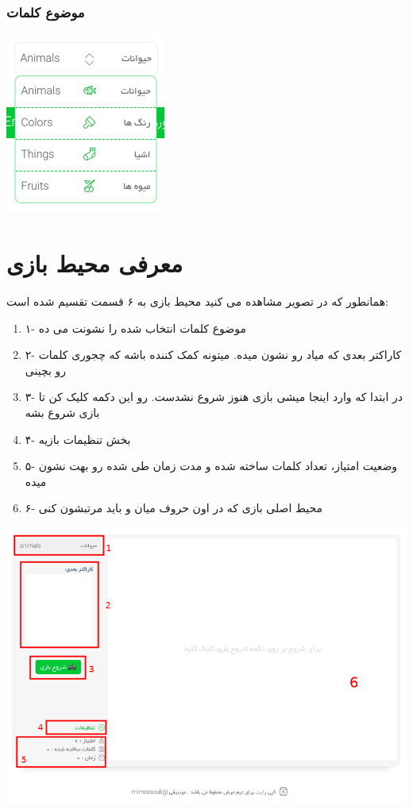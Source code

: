 \documentclass[]{article}
\providecommand{\tightlist}{%
  \setlength{\itemsep}{0pt}\setlength{\parskip}{0pt}}
\begin{document}
\subsubsection{موضوع
کلمات}\label{ux645ux648ux636ux648ux639-ux6a9ux644ux645ux627ux62a}

\includegraphics{../images/select-category.png}

\section{معرفی محیط
بازی}\label{ux645ux639ux631ux641ux6cc-ux645ux62dux6ccux637-ux628ux627ux632ux6cc}

همانطور که در تصویر مشاهده می کنید محیط بازی به ۶ قسمت تقسیم شده است:

\begin{enumerate}
\tightlist
\item
  ۱- موضوع کلمات انتخاب شده را نشونت می ده
\item
  ۲- کاراکتر بعدی که میاد رو نشون میده. میتونه کمک کننده باشه که چجوری
  کلمات رو بچینی
\item
  ۳- در ابتدا که وارد اینجا میشی بازی هنوز شروع نشدست. رو این دکمه کلیک
  کن تا بازی شروع بشه
\item
  ۴- بخش تنظیمات بازیه
\item
  ۵- وضعیت امتیاز، تعداد کلمات ساخته شده و مدت زمان طی شده رو بهت نشون
  میده
\item
  ۶- محیط اصلی بازی که در اون حروف میان و باید مرتبشون کنی
\end{enumerate}

\includegraphics{../images/enviroment.png}
\end{document}
